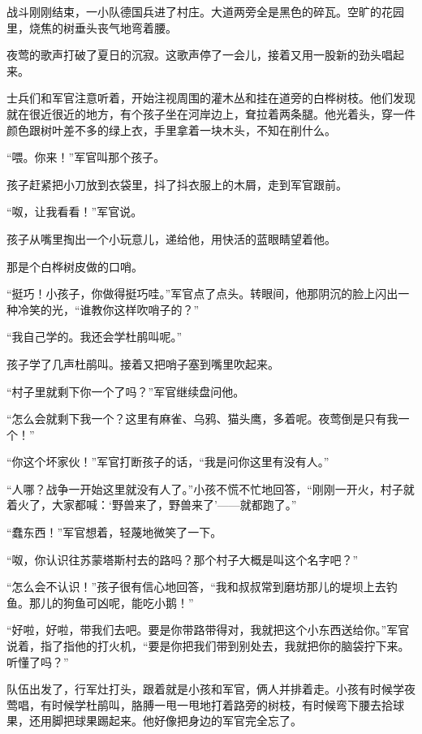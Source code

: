 \documentclass[12pt,UTF-8,openany]{ctexbook}
\begin{document}
\begin{large}
    
    战斗刚刚结束，一小队德国兵进了村庄。大道两旁全是黑色的碎瓦。空旷的花园里，烧焦的树垂头丧气地弯着腰。
    
    夜莺的歌声打破了夏日的沉寂。这歌声停了一会儿，接着又用一股新的劲头唱起来。
    
    士兵们和军官注意听着，开始注视周围的灌木丛和挂在道旁的白桦树枝。他们发现就在很近很近的地方，有个孩子坐在河岸边上，耷拉着两条腿。他光着头，穿一件颜色跟树叶差不多的绿上衣，手里拿着一块木头，不知在削什么。
    
    “喂。你来！”军官叫那个孩子。
    
    孩子赶紧把小刀放到衣袋里，抖了抖衣服上的木屑，走到军官跟前。
    
    “呶，让我看看！”军官说。
    
    孩子从嘴里掏出一个小玩意儿，递给他，用快活的蓝眼睛望着他。
    
    那是个白桦树皮做的口哨。
    
    “挺巧！小孩子，你做得挺巧哇。”军官点了点头。转眼间，他那阴沉的脸上闪出一种冷笑的光，“谁教你这样吹哨子的？”
    
    “我自己学的。我还会学杜鹃叫呢。”
    
    孩子学了几声杜鹃叫。接着又把哨子塞到嘴里吹起来。
    
    “村子里就剩下你一个了吗？”军官继续盘问他。
    
    “怎么会就剩下我一个？这里有麻雀、乌鸦、猫头鹰，多着呢。夜莺倒是只有我一个！”
    
    “你这个坏家伙！”军官打断孩子的话，“我是问你这里有没有人。”
    
    “人哪？战争一开始这里就没有人了。”小孩不慌不忙地回答，“刚刚一开火，村子就着火了，大家都喊：‘野兽来了，野兽来了’——就都跑了。”
    
    “蠢东西！”军官想着，轻蔑地微笑了一下。
    
    “呶，你认识往苏蒙塔斯村去的路吗？那个村子大概是叫这个名字吧？”
    
    “怎么会不认识！”孩子很有信心地回答，“我和叔叔常到磨坊那儿的堤坝上去钓鱼。那儿的狗鱼可凶呢，能吃小鹅！”
    
    “好啦，好啦，带我们去吧。要是你带路带得对，我就把这个小东西送给你。”军官说着，指了指他的打火机，“要是你把我们带到别处去，我就把你的脑袋拧下来。听懂了吗？”
    
    队伍出发了，行军灶打头，跟着就是小孩和军官，俩人并排着走。小孩有时候学夜莺唱，有时候学杜鹃叫，胳膊一甩一甩地打着路旁的树枝，有时候弯下腰去拾球果，还用脚把球果踢起来。他好像把身边的军官完全忘了。
    

\end{large}
\end{document}
